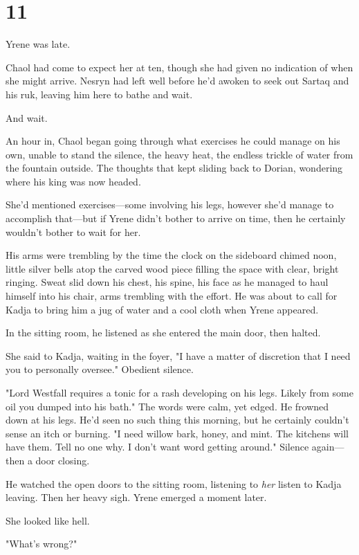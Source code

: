 
\chapter{11}

Yrene was late.

Chaol had come to expect her at ten, though she had given no indication of when she might arrive.
Nesryn had left well before he'd awoken to seek out Sartaq and his ruk, leaving him here to bathe and 
wait.

And wait.

An hour in, Chaol began going through what exercises he could manage on his own, unable to stand the silence, the heavy heat, the endless trickle of water from the fountain outside.
The thoughts that kept sliding back to Dorian, wondering where his king was now headed.

She'd mentioned exercises---some involving his legs, however she'd manage to accomplish that---but if Yrene didn't bother to arrive on time, then he certainly wouldn't bother to wait for her.

His arms were trembling by the time the clock on the sideboard chimed noon, little silver bells atop the carved wood piece filling the space with clear, bright ringing.
Sweat slid down his chest, his spine, his face as he managed to haul himself into his chair, arms trembling with the effort.
He was about to call for Kadja to bring him a jug of water and a cool cloth when Yrene appeared.

In the sitting room, he listened as she entered the main door, then halted.

She said to Kadja, waiting in the foyer, "I have a matter of discretion that I need you to personally oversee."
Obedient silence.

"Lord Westfall requires a tonic for a rash developing on his legs.
Likely from some oil you dumped into his bath."
The words were calm, yet edged.
He frowned down at his legs.
He'd seen no such thing this morning, but he certainly couldn't sense an itch or burning.
"I need willow bark, honey, and mint.
The kitchens will have them.
Tell no one why.
I don't want word getting around."
Silence again---then a door closing.

He watched the open doors to the sitting room, listening to \emph{her}
listen to Kadja leaving.
Then her heavy sigh.
Yrene emerged a moment later.

She looked like hell.

"What's wrong?"

